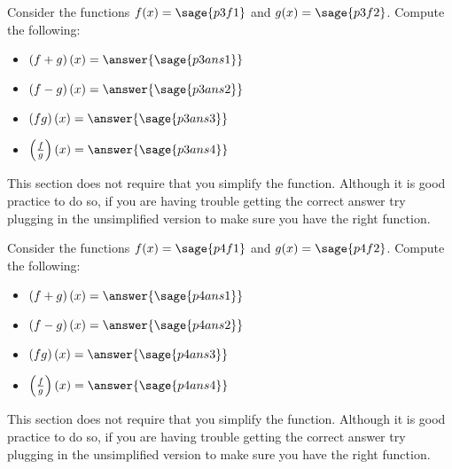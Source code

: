 \documentclass{ximera}
\begin{document}
\begin{problem}
    Consider the functions $f(x) = \sage{p3f1}$ and $g(x) = \sage{p3f2}$. Compute the following:
    \begin{itemize}
        \item $\left(f+g\right)(x) = \answer{\sage{p3ans1}}$
        \item $\left(f-g\right)(x) = \answer{\sage{p3ans2}}$
        \item $\left(fg\right)(x) = \answer{\sage{p3ans3}}$
        \item $\left(\frac{f}{g}\right)(x) = \answer{\sage{p3ans4}}$
    \end{itemize}
    \begin{feedback}
        This section does not require that you simplify the function. Although it is good practice to do so, if you are having trouble getting the correct answer try plugging in the unsimplified version to make sure you have the right function.
    \end{feedback}
\end{problem}


\begin{problem}
    Consider the functions $f(x) = \sage{p4f1}$ and $g(x) = \sage{p4f2}$. Compute the following:
    \begin{itemize}
        \item $\left(f+g\right)(x) = \answer{\sage{p4ans1}}$
        \item $\left(f-g\right)(x) = \answer{\sage{p4ans2}}$
        \item $\left(fg\right)(x) = \answer{\sage{p4ans3}}$
        \item $\left(\frac{f}{g}\right)(x) = \answer{\sage{p4ans4}}$
    \end{itemize}
    \begin{feedback}
        This section does not require that you simplify the function. Although it is good practice to do so, if you are having trouble getting the correct answer try plugging in the unsimplified version to make sure you have the right function.
    \end{feedback}
\end{problem}
\end{document}
